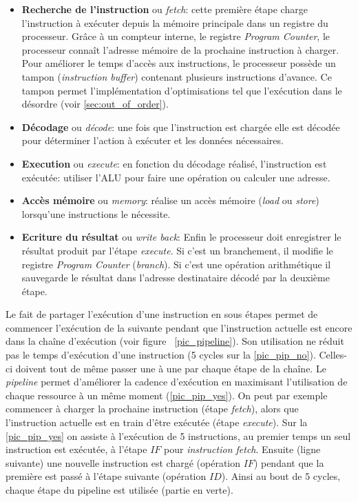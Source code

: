 \begin{itemize}
    \item \textbf{Recherche de l'instruction} ou \textit{fetch}: cette première étape charge l'instruction à exécuter depuis la mémoire principale dans un registre du processeur. Grâce à un compteur interne, le registre \textit{Program Counter}, le processeur connaît l'adresse mémoire de la prochaine instruction à charger. Pour améliorer le temps d'accès aux instructions, le processeur possède un tampon (\textit{instruction buffer}) contenant plusieurs instructions d'avance. Ce tampon permet l'implémentation d'optimisations tel que l'exécution dans le désordre (voir \autoref{sec:out_of_order}).
    \item \textbf{Décodage} ou \textit{décode}: une fois que l'instruction est chargée elle est décodée pour déterminer l'action à exécuter et les données nécessaires.
    \item \textbf{Execution} ou \textit{execute}: en fonction du décodage réalisé, l'instruction est exécutée: utiliser l'ALU pour faire une opération ou calculer une adresse.
    \item \textbf{Accès mémoire} ou \textit{memory}: réalise un accès mémoire (\textit{load} ou \textit{store}) lorsqu'une instructions le nécessite.
    \item \textbf{Ecriture du résultat} ou \textit{write back}: Enfin le processeur doit enregistrer le résultat produit par l'étape \textit{execute}. Si c'est un branchement, il modifie le registre \textit{Program Counter} (\textit{branch}). Si c'est une opération arithmétique il sauvegarde le résultat dans l'adresse destinataire décodé par la deuxième étape.
\end{itemize}

Le fait de partager l'exécution d'une instruction en sous étapes permet de commencer l'exécution de la suivante pendant que l'instruction actuelle est encore dans la chaîne d'exécution (voir figure ~\ref{pic_pipeline}). Son utilisation ne réduit pas le temps d'exécution d'une instruction (5 cycles sur la \autoref{pic_pip_no}). Celles-ci doivent tout de même passer une à une par chaque étape de la chaîne. Le \textit{pipeline} permet d'améliorer la cadence d'exécution en maximisant l'utilisation de chaque ressource à un même moment (\autoref{pic_pip_yes}). On peut par exemple commencer à charger la prochaine instruction (étape \textit{fetch}), alors que l'instruction actuelle est en train d'être exécutée (étape \textit{execute}). Sur la \autoref{pic_pip_yes} on assiste à l'exécution de 5 instructions, au premier temps un seul instruction est exécutée, à l'étape $IF$ pour \textit{instruction fetch}. Ensuite (ligne suivante) une nouvelle instruction est chargé (opération $IF$) pendant que la première est passé à l'étape suivante (opération $ID$). Ainsi au bout de 5 cycles, chaque étape du pipeline est utilisée (partie en verte). 



